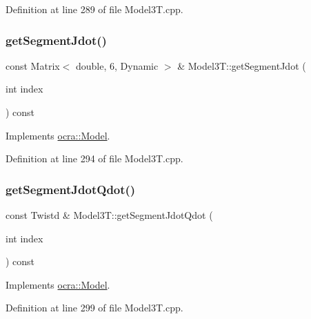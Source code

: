 Definition at line 289 of file Model3\+T.\+cpp.

\hypertarget{classModel3T_a24e4def66a047175935bf343f38a8b84}{}\label{classModel3T_a24e4def66a047175935bf343f38a8b84} 
\subsubsection{\texorpdfstring{get\+Segment\+Jdot()}{getSegmentJdot()}}
{\footnotesize\ttfamily const Matrix$<$ double, 6, Dynamic $>$ \& Model3\+T\+::get\+Segment\+Jdot (\begin{DoxyParamCaption}\item[{int}]{index }\end{DoxyParamCaption}) const\hspace{0.3cm}{\ttfamily [virtual]}}



Implements \hyperlink{classocra_1_1Model_a00cceda96b47bee05cb6366d070d7961}{ocra\+::\+Model}.



Definition at line 294 of file Model3\+T.\+cpp.

\hypertarget{classModel3T_add0fcd2f4259009f964a03c6402d1ca9}{}\label{classModel3T_add0fcd2f4259009f964a03c6402d1ca9} 
\subsubsection{\texorpdfstring{get\+Segment\+Jdot\+Qdot()}{getSegmentJdotQdot()}}
{\footnotesize\ttfamily const Twistd \& Model3\+T\+::get\+Segment\+Jdot\+Qdot (\begin{DoxyParamCaption}\item[{int}]{index }\end{DoxyParamCaption}) const\hspace{0.3cm}{\ttfamily [virtual]}}



Implements \hyperlink{classocra_1_1Model_a6fe0178b1e8213e39366b2355d0d4de3}{ocra\+::\+Model}.



Definition at line 299 of file Model3\+T.\+cpp.

\hypertarget{classModel3T_a644b29c19a8a08e82f74ff411f5963df}{}\label{classModel3T_a644b29c19a8a08e82f74ff411f5963df} 
